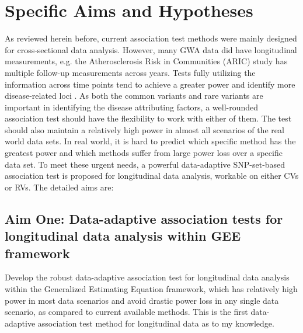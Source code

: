 \documentclass[12pt]{article}
\begin{document}
\section{Specific Aims and Hypotheses}\label{sec:aims}
As reviewed herein before, current association test methods were mainly designed for cross-sectional data analysis. However, many GWA data did have longitudinal measurements, e.g. the Atherosclerosis Risk in Communities (ARIC) study \cite{Chambless1997} has multiple follow-up measurements across years. Tests fully utilizing the information across time points tend to achieve a greater power and identify more disease-related loci \cite{Furlotte2012,Xu2014}. As both the common variants and rare variants are important in identifying the disease attributing factors, a well-rounded association test should have the flexibility to work with either of them. The test should also maintain a relatively high power in almost all scenarios of the real world data sets. In real world, it is hard to predict which specific method has the greatest power and which methods suffer from large power loss over a specific data set. To meet these urgent needs, a powerful data-adaptive SNP-set-based association test is proposed for longitudinal data analysis, workable on either CVs or RVs. The detailed aims are:
\subsection{Aim One: Data-adaptive association tests for longitudinal data analysis within GEE framework}
Develop the robust data-adaptive association test for longitudinal data analysis within the Generalized Estimating Equation framework, which has relatively high power in most data scenarios and avoid drastic power loss in any single data scenario, as compared to current available methods. This is the first data-adaptive association test method for longitudinal data as to my knowledge.
\end{document}
